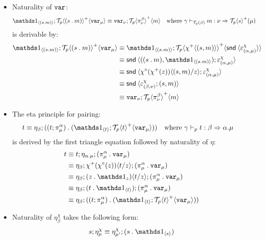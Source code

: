\documentclass[10pt]{article}
\theoremstyle{definition}
\newcommand\dsd[1]{\ensuremath{\mathsf{#1}}}
\newcommand{\tcell}{\Rightarrow}
\newcommand{\app}[2]{\ensuremath{#1 \: #2}}
\newcommand{\snd}[1]{\app{\dsd{snd}}{#1}}
\newcommand\TermTwoT[5]{\ensuremath{#1 \vdash_{#5} {#2} : #3 \tcell #4}}
\newcommand\TrPlus[2]{\ensuremath{{#1}^+(#2)}}
\newcommand\TrCirc[2]{\ensuremath{{#1}^\circ(#2)}}
\newcommand\El[2]{\mathcal{T}_{#1}(#2)}
\newcommand\ApEl[2]{\mathcal{T}_{#1}\langle#2\rangle}
\newcommand\bdot[0]{\mathbin{.}}
\newcommand\ap[2]{\ensuremath{#1 \langle #2 \rangle }}
\newcommand\ApPlus[2]{\ensuremath{{#1}^+ \langle #2 \rangle }}
\begin{document}
\begin{itemize}
\item Naturality of $\mathtt{var}_{}$:
\begin{align}
\label{beta-var}
\ApOne{(s \bdot m)};\ApPlus{\ApEl{p}{(s \bdot m)}}{\var{\mu}} &\equiv \var{\nu};\ApPlus{\ApEl{p}{\pi^\beta_\nu}}{m}  && \text{where } \TermTwoT{\gamma}{m}{\nu}{\TrPlus{\ApEl{p}{s}}{\mu}}{\El{p}{\beta}}
\end{align}
is derivable by:
\begin{align*}
\ApOne{(s \bdot m)};\ApPlus{\ApEl{p}{(s \bdot m)}}{\var{\mu}} 
&\equiv \ApOne{(s \bdot m)};\ApPlus{\ApEl{p}{\ApPlus{\chi}{(s, m)}}}{\ap \snd {\varepsilon^\chi_{(\alpha, \mu)}}} \\
&\equiv \ap \snd {((s \bdot m), \ApOne{(s \bdot m)});\varepsilon^\chi_{(\alpha, \mu)}} \\
&\equiv \ap \snd {\ap{\TrCirc{\chi}{\TrPlus{\chi}{z}}}{(s, m)/z};\varepsilon^\chi_{(\alpha, \mu)}} \\
&\equiv \ap \snd {\varepsilon^\chi_{(\beta, \nu)};(s, m)} \\
&\equiv \var{\nu}; \ApPlus{\ApEl{p}{\pi^\beta_{\nu}}}{m} 
\end{align*}

\item The eta principle for pairing:
\begin{align}
\label{eta-pi-var}
t &\equiv \eta_\beta;((t;\pi_\mu^\alpha) \bdot (\ApOne{t}; \ApPlus{\ApEl{p}{t}}{\var{\mu}})) && \text{where } \TermTwoT{\gamma}{t}{\beta}{\alpha.\mu}{p}
\end{align}
is derived by the first triangle equation followed by naturality of $\eta$:
\begin{align*}
t &\equiv t;\eta_{\alpha.\mu};(\pi_\mu^\alpha \bdot \var{\mu}) \\
&\equiv \eta_\beta;\ap{\TrPlus{\chi}{\TrCirc{\chi}{z}}}{t/z};(\pi_\mu^\alpha \bdot \var{\mu}) \\
&\equiv \eta_\beta;\ap{(z \bdot \One_z)}{t/z};(\pi_\mu^\alpha \bdot \var{\mu}) \\
&\equiv \eta_\beta;(t \bdot \ApOne{t});(\pi_\mu^\alpha \bdot \var{\mu}) \\
&\equiv \eta_\beta;((t;\pi_\mu^\alpha) \bdot (\ApOne{t}; \ApPlus{\ApEl{p}{t}}{\var{\mu}})) \\
\end{align*}

\item Naturality of $\eta^\chi_\beta$ takes the following form:
\begin{align*}
s;\eta^\chi_\mu \equiv \eta^\chi_{\mu'} ; (s \bdot \ApOne{s})
\end{align*}

\end{itemize}
\end{document}

